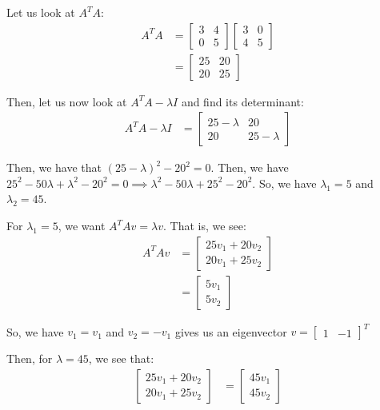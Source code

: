 \documentclass[openany]{book}
\begin{document}
\begin{solution}
	Let us look at $A^{T}A$:
	\begin{align*}
		A^{T}A &= \begin{bmatrix}
			3 & 4 \\
			0 & 5
		\end{bmatrix}\begin{bmatrix}
		3 & 0 \\ 4 & 5
	\end{bmatrix} \\
	&= \begin{bmatrix}
		25 & 20 \\
		20 & 25
	\end{bmatrix}
	\end{align*}

	Then, let us now look at $A^{T}A - \lambda I$ and find its determinant:
	\begin{align*}
		A^{T}A - \lambda I &= \begin{bmatrix}
			25 - \lambda & 20 \\
			20 & 25 - \lambda
		\end{bmatrix}
	\end{align*}
	
	Then, we have that $(25-\lambda)^{2} - 20^{2} = 0$. Then, we have $25^{2} - 50\lambda + \lambda^{2} - 20^{2} = 0 \implies \lambda^{2} - 50\lambda + 25^{2} - 20^{2}$. So, we have $\lambda_1 = 5$ and $\lambda_2 = 45$.
	
	For $\lambda_1 = 5$, we want $A^{T}Av = \lambda v$. That is, we see:
	\begin{align*}
		A^{T}Av &= \begin{bmatrix}
			25v_1 + 20v_2 \\ 20v_1 + 25v_2
		\end{bmatrix} \\
		&= \begin{bmatrix}
			5v_1 \\ 5v_2
		\end{bmatrix}
	\end{align*}

	So, we have $v_1 = v_1$ and $v_2 = -v_1$ gives us an eigenvector $v = \begin{bmatrix}
		1 & -1
	\end{bmatrix}^{T}$

	Then, for $\lambda = 45$, we see that:
	\begin{align*}
		\begin{bmatrix}
			25v_1 + 20v_2 \\
			20v_1 + 25v_2
		\end{bmatrix} &= \begin{bmatrix}
		45v_1 \\ 45v_2
	\end{bmatrix}
	\end{align*}


\end{solution}
\end{document}
